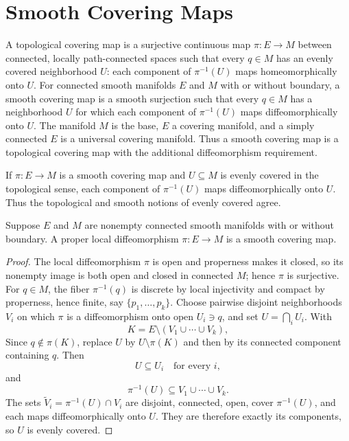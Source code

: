 \section{Smooth Covering Maps}

\begin{definition}
\label{def:4-26-extra-1}
\leanok
A topological covering map is a surjective continuous map $\pi:E\to M$ between connected, locally path-connected spaces such that every $q\in M$ has an evenly covered neighborhood $U$: each component of $\pi^{-1}(U)$ maps homeomorphically onto $U$. For connected smooth manifolds $E$ and $M$ with or without boundary, a smooth covering map is a smooth surjection such that every $q\in M$ has a neighborhood $U$ for which each component of $\pi^{-1}(U)$ maps diffeomorphically onto $U$. The manifold $M$ is the base, $E$ a covering manifold, and a simply connected $E$ is a universal covering manifold. Thus a smooth covering map is a topological covering map with the additional diffeomorphism requirement.
\end{definition}

\begin{proposition}
\label{exer:4-39}
\leanok
{}
If $\pi:E\to M$ is a smooth covering map and $U\subseteq M$ is evenly covered
in the topological sense, each component of $\pi^{-1}(U)$ maps
diffeomorphically onto $U$. Thus the topological and smooth notions of evenly
covered agree.
\end{proposition}

\begin{proposition}
\label{prop:4-46}
\leanok
{}
Suppose $E$ and $M$ are nonempty connected smooth manifolds with or without boundary. A proper local diffeomorphism $\pi:E\to M$ is a smooth covering map.
\end{proposition}

\begin{proof}
\leanok
\sketch
The local diffeomorphism $\pi$ is open and properness makes it closed, so its nonempty image is both open and closed in connected $M$; hence $\pi$ is surjective. For $q\in M$, the fiber $\pi^{-1}(q)$ is discrete by local injectivity and compact by properness, hence finite, say $\{p_1,\ldots,p_k\}$. Choose pairwise disjoint neighborhoods $V_i$ on which $\pi$ is a diffeomorphism onto open $U_i\ni q$, and set $U=\bigcap_iU_i$. With
\[
K=E\setminus(V_1\cup\cdots\cup V_k),
\]
Since $q\notin\pi(K)$, replace $U$ by $U\setminus\pi(K)$ and then by its connected component containing $q$. Then
\begin{equation}
U\subseteq U_i\quad\text{for every }i, \tag{4.8}
\end{equation}
and
\begin{equation}
\pi^{-1}(U)\subseteq V_1\cup\cdots\cup V_k. \tag{4.9}
\end{equation}
The sets $\widetilde V_i=\pi^{-1}(U)\cap V_i$ are disjoint, connected, open, cover $\pi^{-1}(U)$, and each maps diffeomorphically onto $U$. They are therefore exactly its components, so $U$ is evenly covered.
\end{proof}
